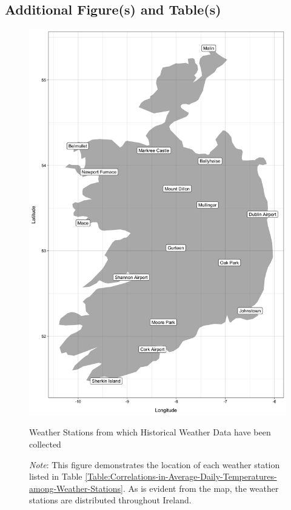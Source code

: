 \subsection{Additional Figure(s) and Table(s)}
    \begin{figure}[!ht]
        \centering
        \includegraphics[scale = 0.13]{03_Chapter-2/00A_Figures/Figure_Location-of-Weather-Stations.png}
        \caption{Weather Stations from which Historical Weather Data have been collected}
        \caption*{
            {\small
            \textit{Note}: This figure demonstrates the location of each weather station listed in Table \ref{Table:Correlations-in-Average-Daily-Temperatures-among-Weather-Stations}. As is evident from the map, the weather stations are distributed throughout Ireland.
        }}
        \label{Figure:Weather-Stations}
    \end{figure}
\clearpage






\clearpage


\clearpage


\clearpage
